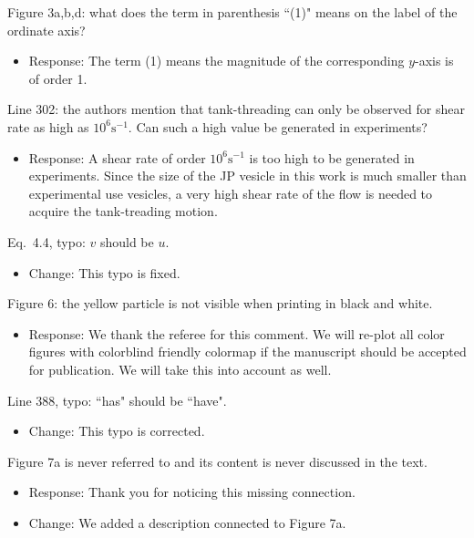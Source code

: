 \documentclass[11pt]{article}
\newcommand{\comment}[1]{{\color{blue} #1}}
\begin{document}
\noindent
\comment{Figure 3a,b,d: what does the term in parenthesis ``(1)" means
on the label of the ordinate axis?}
\begin{itemize}
  \item Response: The term (1) means the magnitude of the corresponding $y$-axis is of order 1.
\end{itemize}

\noindent
\comment{Line 302: the authors mention that tank-threading can only be
observed for shear rate as high as $10^{6}\text{s}^{-1}$. Can such a
high value be generated in experiments?}
\begin{itemize}
  \item Response: A shear rate of order $10^{6}\text{s}^{-1}$ is too high to be generated in experiments.
Since the size of the JP vesicle in this work is much smaller than experimental use vesicles, 
a very high shear rate of the flow is needed to acquire the tank-treading motion.
\end{itemize}

\noindent
\comment{Eq.~4.4, typo: $v$ should be $u$.}
\begin{itemize}
  \item Change: This typo is fixed.
\end{itemize}

\noindent
\comment{Figure 6: the yellow particle is not visible when printing in
black and white.}
\begin{itemize}
  \item Response: We thank the referee for this comment. We will re-plot all color figures with colorblind friendly colormap if the manuscript should be accepted for publication. We will take this into account as well.
\end{itemize}

\noindent
\comment{Line 388, typo: ``has" should be ``have".}
\begin{itemize}
  \item Change: This typo is corrected.
\end{itemize}

\noindent
\comment{Figure 7a is never referred to and its content is never
discussed in the text.}
\begin{itemize}
  \item Response: Thank you for noticing this missing connection. 
  \item Change: We added a description connected to Figure 7a.
\end{itemize}
\end{document}
